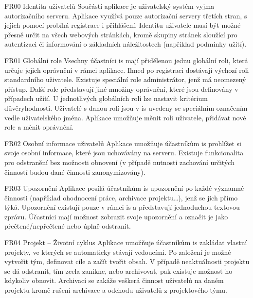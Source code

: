 \begin{dl}
   \item[FR00 Identita uživatelů]
   Součástí aplikace je uživatelský systém vyjma autorizačního serveru. Aplikace využívá pouze autorizační servery třetích stran, s jejich pomocí probíhá registrace i přihlášení. Identitu uživatele musí být možné přesně určit na všech webových stránkách, kromě skupiny stránek sloužící pro autentizaci či informování o základních náležitostech (například podmínky užití).

   \item[FR01 Globální role]
   Vsechny účastníci \gls{is} mají přidělenou jednu globální roli, která určuje jejich oprávnění v rámci aplikace. Ihned po registraci dostávají výchozí roli standardního uživatele. Existuje speciální role administrátor, jenž má neomezený přístup. Další role představují jiné množiny oprávnění, které jsou definovány v případech užití. U jednotlivých globálních rolí lze nastavit kritérium důvěryhodnosti. Uživatelé s danou rolí jsou v \gls{is} uvedeny se speciálním označením vedle uživatelského jména. Aplikace umožňuje měnit roli uživatele, přidávat nové role a měnit oprávnění.

   \item[FR02 Osobní informace uživatelů]
   Aplikace umožňuje účastníkům \gls{is} prohlížet si svoje osobní informace, které jsou uchovávány na serveru. Existuje funkcionalita pro odstranění bez možnosti obnovení (v případě nutnosti zachování určitých činností budou dané činnosti zanonymizovány).

   \item[FR03 Upozornění]
   Aplikace posílá účastníkům \gls{is} upozornění po každé významné činnosti (například ohodnocení práce, archivace projektu\dots{}), jenž se jich přímo týká. Upozornění existují pouze v rámci \gls{is} a představují jednoduchou textovou zprávu. Účastníci mají možnost zobrazit svoje upozornění a označit je jako přečtené/nepřečtené nebo úplně odstranit.

   \item[FR04 Projekt -- Životní cyklus]
   Aplikace umožňuje účastníkům \gls{is} zakládat vlastní projekty, ve kterých se automaticky stávají vedoucími. Po založení je možné vytvořit tým, definovat cíle a začít tvořit obsah. V případě neaktuálnosti projektu se dá odstranit, tím zcela zanikne, nebo archivovat, pak existuje možnost ho kdykoliv obnovit. Archivací se zakáže veškerá činnost uživatelů na daném projektu kromě rušení archivace a odchodu uživatelů z projektového týmu.


\end{dl}
